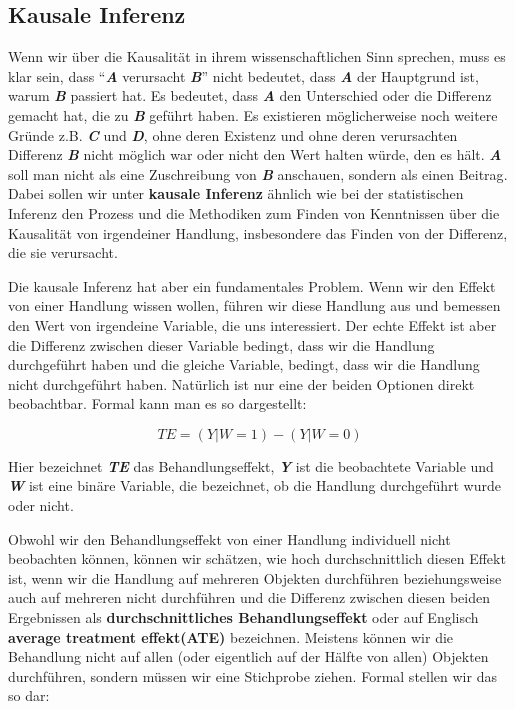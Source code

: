 \documentclass[12pt,a4paper,twoside]{scrartcl}
\numberwithin{equation}{section}
\begin{document}
  	\subsection{Kausale Inferenz}\label{subsec:kausalität}
  	Wenn wir über die Kausalität in ihrem wissenschaftlichen Sinn sprechen, muss es klar sein, dass \enquote{\textbf{\textit{A}} verursacht \textbf{\textit{B}}} nicht bedeutet, dass \textbf{\textit{A}} der Hauptgrund ist, warum \textbf{\textit{B}} passiert hat. Es bedeutet, dass \textbf{\textit{A}} den Unterschied oder die Differenz gemacht hat, die zu \textbf{\textit{B}} geführt haben. Es existieren möglicherweise noch weitere Gründe z.B. \textbf{\textit{C}} und \textbf{\textit{D}}, ohne deren Existenz und ohne deren verursachten Differenz \textbf{\textit{B}} nicht möglich war oder nicht den Wert halten würde, den es hält. \textbf{\textit{A}} soll man nicht als eine Zuschreibung von \textbf{\textit{B}} anschauen, sondern als einen Beitrag\cite{MacHum}.  Dabei sollen wir unter \textbf{kausale Inferenz} ähnlich wie bei der statistischen Inferenz den Prozess und die Methodiken zum Finden von Kenntnissen über die Kausalität von irgendeiner Handlung, insbesondere das Finden von der Differenz, die sie verursacht.\par
  	

\noindent	
Die kausale Inferenz hat aber ein fundamentales Problem. Wenn wir den Effekt von einer Handlung wissen wollen, führen wir diese Handlung aus und bemessen den Wert von irgendeine Variable, die uns interessiert. Der echte Effekt ist aber die Differenz zwischen dieser Variable bedingt, dass wir die Handlung durchgeführt haben und die gleiche Variable, bedingt, dass wir die Handlung nicht durchgeführt haben\cite{holland1986statistics}. Natürlich ist nur eine der beiden Optionen direkt beobachtbar. Formal kann man es so dargestellt: \par
  	
\begin{equation}
  TE = (Y|W = 1) - (Y|W = 0)
\end{equation}  	
  	
\noindent	  	
Hier bezeichnet \textbf{\textit{TE}} das Behandlungseffekt, \textbf{\textit{Y}} ist die beobachtete Variable und \textbf{\textit{W}} ist eine binäre Variable, die bezeichnet, ob die Handlung durchgeführt wurde oder nicht.\par

\noindent	  	
Obwohl wir den Behandlungseffekt von einer Handlung individuell nicht beobachten können, können wir schätzen, wie hoch durchschnittlich diesen Effekt ist, wenn wir die Handlung auf mehreren Objekten durchführen beziehungsweise auch auf mehreren nicht durchführen und die Differenz zwischen diesen beiden Ergebnissen als \textbf{durchschnittliches Behandlungseffekt} oder auf Englisch \textbf{average treatment effekt(ATE)} bezeichnen. Meistens können wir die Behandlung nicht auf allen (oder eigentlich auf der Hälfte von allen) Objekten durchführen, sondern müssen wir eine Stichprobe ziehen.  Formal stellen wir das so dar: \par
\end{document}
